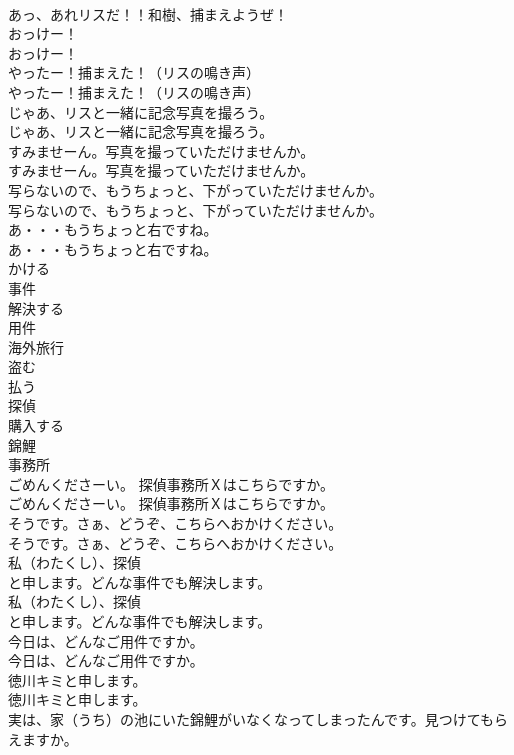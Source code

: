 \documentclass[8pt]{extreport}
\begin{document}
\begin{CJK}{UTF8}{min}
\\	あっ、あれリスだ！！和樹、捕まえようぜ！ 
\\	おっけー！	
\\	おっけー！ 
\\	やったー！捕まえた！（リスの鳴き声）	
\\	やったー！捕まえた！（リスの鳴き声） 
\\	じゃあ、リスと一緒に記念写真を撮ろう。	
\\	じゃあ、リスと一緒に記念写真を撮ろう。 
\\	すみませーん。写真を撮っていただけませんか。	
\\	すみませーん。写真を撮っていただけませんか。 
\\	写らないので、もうちょっと、下がっていただけませんか。	
\\	写らないので、もうちょっと、下がっていただけませんか。 
\\	あ・・・もうちょっと右ですね。	
\\	あ・・・もうちょっと右ですね。 
\\	かける
\\	事件
\\	解決する
\\	用件
\\	海外旅行
\\	盗む
\\	払う
\\	探偵
\\	購入する
\\	錦鯉
\\	事務所
\\	ごめんくださーい。 探偵事務所Ｘはこちらですか。	
\\	ごめんくださーい。 探偵事務所Ｘはこちらですか。 
\\	そうです。さぁ、どうぞ、こちらへおかけください。	
\\	そうです。さぁ、どうぞ、こちらへおかけください。 
\\	私（わたくし）、探偵
\\	と申します。どんな事件でも解決します。	
\\	私（わたくし）、探偵
\\	と申します。どんな事件でも解決します。 
\\	今日は、どんなご用件ですか。	
\\	今日は、どんなご用件ですか。 
\\	徳川キミと申します。	
\\	徳川キミと申します。 
\\	実は、家（うち）の池にいた錦鯉がいなくなってしまったんです。見つけてもらえますか。	

\end{CJK}
\end{document}
